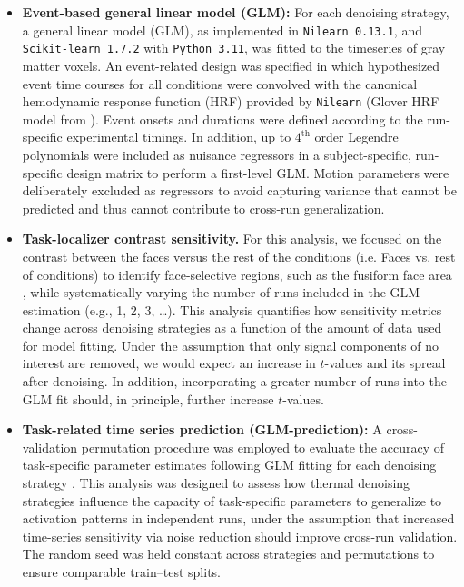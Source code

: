 \begin{itemize}

\item {\textbf{Event-based general linear model (GLM):} For each denoising strategy, a general linear model (GLM), as implemented in \texttt{Nilearn 0.13.1}, and \texttt{Scikit-learn 1.7.2} with \texttt{Python 3.11}, was fitted to the timeseries of gray matter voxels.  An event-related design was specified in which hypothesized event time courses for all conditions were convolved with the canonical hemodynamic response function (HRF) provided by \texttt{Nilearn} (Glover HRF model from \citet{gloverDeconvolutionImpulseResponse1999}). Event onsets and durations were defined according to the run-specific experimental timings. In addition, up to $4^{\textrm{th}}$ order Legendre polynomials were included as nuisance regressors in a subject-specific, run-specific design matrix to perform a first-level GLM. Motion parameters were deliberately excluded as regressors to avoid capturing variance that cannot be predicted and thus cannot contribute to cross-run generalization.}

\item{\textbf{Task-localizer contrast sensitivity.} For this analysis, we focused on the contrast between the faces versus the rest of the conditions (i.e. Faces vs. rest of conditions) to identify face-selective regions, such as the fusiform face area \citep{bermanEvaluatingFunctionalLocalizers2010}, while systematically varying the number of runs included in the GLM estimation (e.g., 1, 2, 3, …). This analysis quantifies how sensitivity metrics change across denoising strategies as a function of the amount of data used for model fitting. Under the assumption that only signal components of no interest are removed, we would expect an increase in $t$-values and its spread after denoising. In addition, incorporating a greater number of runs into the GLM fit should, in principle, further increase $t$-values.}

\item {\textbf{Task-related time series prediction (GLM-prediction):} A cross-validation permutation procedure was employed to evaluate the accuracy of task-specific parameter estimates following GLM fitting for each denoising strategy
\citep{princeImprovingAccuracySingletrial2022,dowdle2023evaluating}. This analysis was designed to assess how thermal denoising strategies influence the capacity of task-specific parameters to generalize to activation patterns in independent runs, under the assumption that increased time-series sensitivity via noise reduction should improve cross-run validation. The random seed was held constant across strategies and permutations to ensure comparable train–test splits.

}
\end{itemize}
